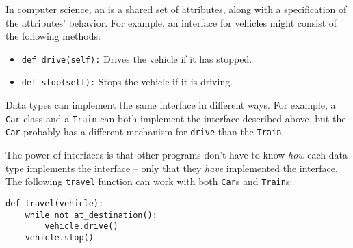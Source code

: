 In computer science, an  is a shared set of attributes, along
with a specification of the attributes' behavior.  For example, an interface for
vehicles might consist of the following methods:
\begin{itemize}
\item \texttt{def drive(self):} Drives the vehicle if it has stopped.
\item \texttt{def stop(self):} Stops the vehicle if it is driving.
\end{itemize}
Data types can implement the same interface in different ways. For example, a
\texttt{Car} class and a \texttt{Train} can both implement the interface
described above, but the \texttt{Car} probably has a different mechanism for
\texttt{drive} than the \texttt{Train}.

The power of interfaces is that other programs don't have to know \emph{how}
each data type implements the interface -- only that they \emph{have}
implemented the interface. The following \texttt{travel} function can work with
both \texttt{Car}s and \texttt{Train}s:

\begin{lstlisting}
def travel(vehicle):
    while not at_destination():
        vehicle.drive()
    vehicle.stop()
\end{lstlisting}
